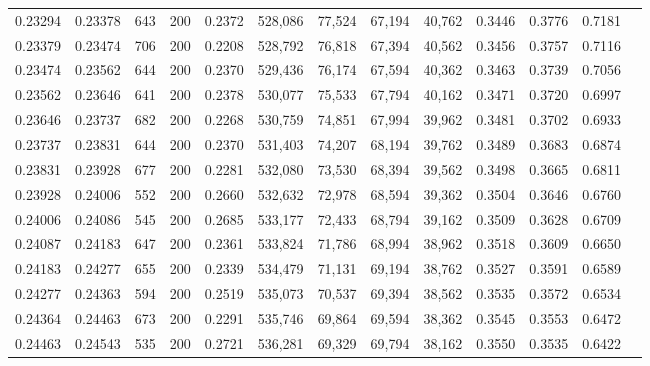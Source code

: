 \begin{tabular}{rrrrrrrrrrrrr}
0.23294 & 0.23378 &   643 & 200 &                                     0.2372 & 528,086 &  77,524 &  67,194 &  40,762 & 0.3446 & 0.3776 & 0.7181 \\
0.23379 & 0.23474 &   706 & 200 &                                     0.2208 & 528,792 &  76,818 &  67,394 &  40,562 & 0.3456 & 0.3757 & 0.7116 \\
0.23474 & 0.23562 &   644 & 200 &                                     0.2370 & 529,436 &  76,174 &  67,594 &  40,362 & 0.3463 & 0.3739 & 0.7056 \\
0.23562 & 0.23646 &   641 & 200 &                                     0.2378 & 530,077 &  75,533 &  67,794 &  40,162 & 0.3471 & 0.3720 & 0.6997 \\
0.23646 & 0.23737 &   682 & 200 &                                     0.2268 & 530,759 &  74,851 &  67,994 &  39,962 & 0.3481 & 0.3702 & 0.6933 \\
0.23737 & 0.23831 &   644 & 200 &                                     0.2370 & 531,403 &  74,207 &  68,194 &  39,762 & 0.3489 & 0.3683 & 0.6874 \\
0.23831 & 0.23928 &   677 & 200 &                                     0.2281 & 532,080 &  73,530 &  68,394 &  39,562 & 0.3498 & 0.3665 & 0.6811 \\
0.23928 & 0.24006 &   552 & 200 &                                     0.2660 & 532,632 &  72,978 &  68,594 &  39,362 & 0.3504 & 0.3646 & 0.6760 \\
0.24006 & 0.24086 &   545 & 200 &                                     0.2685 & 533,177 &  72,433 &  68,794 &  39,162 & 0.3509 & 0.3628 & 0.6709 \\
0.24087 & 0.24183 &   647 & 200 &                                     0.2361 & 533,824 &  71,786 &  68,994 &  38,962 & 0.3518 & 0.3609 & 0.6650 \\
0.24183 & 0.24277 &   655 & 200 &                                     0.2339 & 534,479 &  71,131 &  69,194 &  38,762 & 0.3527 & 0.3591 & 0.6589 \\
0.24277 & 0.24363 &   594 & 200 &                                     0.2519 & 535,073 &  70,537 &  69,394 &  38,562 & 0.3535 & 0.3572 & 0.6534 \\
0.24364 & 0.24463 &   673 & 200 &                                     0.2291 & 535,746 &  69,864 &  69,594 &  38,362 & 0.3545 & 0.3553 & 0.6472 \\
0.24463 & 0.24543 &   535 & 200 &                                     0.2721 & 536,281 &  69,329 &  69,794 &  38,162 & 0.3550 & 0.3535 & 0.6422 \\

\end{tabular}
